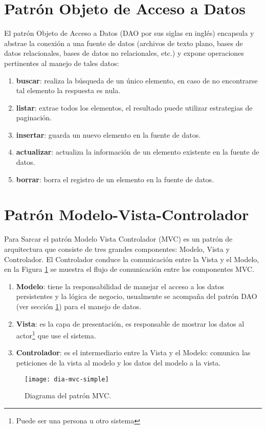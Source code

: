 \section{Patrón Objeto de Acceso a Datos}\label{sec-dao}
El patrón Objeto de Acceso a Datos (DAO por sus siglas en inglés) encapsula y abstrae la conexión a una fuente de datos (archivos de texto plano, bases de datos relacionales, bases de datos no relacionales, etc.) y expone operaciones pertinentes al manejo de tales datos\cite{OCPJavaSE7,OCAPJavaSE7}:
\begin{enumerate}
	\item [] \textbf{buscar}: realiza la búsqueda de un único elemento, en caso de no encontrarse tal elemento la respuesta es nula.
	\item [] \textbf{listar}: extrae todos los elementos, el resultado puede utilizar estrategias de paginación.
	\item [] \textbf{insertar}: guarda un nuevo elemento en la fuente de datos.
	\item [] \textbf{actualizar}: actualiza la información de un elemento existente en la fuente de datos.
	\item [] \textbf{borrar}: borra el registro de un elemento en la fuente de datos.
\end{enumerate}


\section{Patrón Modelo-Vista-Controlador}\label{sec-mvc}
Para Sarcar\cite{JavaDesignPatternsExamples} el patrón Modelo Vista Controlador (MVC) es un patrón de arquitectura que consiste de tres grandes componentes: Modelo, Vista y Controlador. El Controlador conduce la comunicación entre la Vista y el Modelo, en la Figura \ref{fig:dia-mvc-simple} se muestra el flujo de comunicación entre los componentes MVC.
\begin{enumerate}
	\item \textbf{Modelo}: tiene la responsabilidad de manejar el acceso a los datos persistentes y la lógica de negocio, usualmente se acompaña del patrón DAO (ver sección \ref{sec-dao}) para el manejo de datos.
	\item \textbf{Vista}: es la capa de presentación, es responsable de mostrar los datos al actor\footnote{Puede ser una persona u otro sistema} que use el sistema.
	\item \textbf{Controlador}: es el intermediario entre la Vista y el Modelo: comunica las peticiones de la vista al modelo y los datos del modelo a la vista.
\end{enumerate}
\begin{figure}[h]
  \centering
  \texttt{[image: dia-mvc-simple]}
  \caption{Diagrama del patrón MVC\cite{JavaDesignPatternsExamples}.}
  \label{fig:dia-mvc-simple}
\end{figure}

